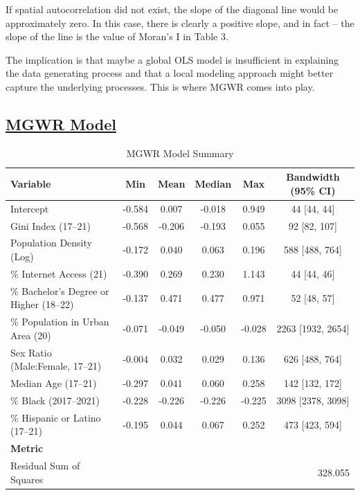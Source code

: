\documentclass[
]{article}
\begin{document}
If spatial autocorrelation did not exist, the slope of the diagonal line
would be approximately zero. In this case, there is clearly a positive
slope, and in fact -- the slope of the line is the value of Moran's I in
Table 3.

The implication is that maybe a global OLS model is insufficient in
explaining the data generating process and that a local modeling
approach might better capture the underlying processes. This is where
MGWR comes into play.

\newpage

\subsection{\texorpdfstring{\ul{MGWR
Model}}{MGWR Model}}\label{mgwr-model}

\begin{table}[H]
\renewcommand{\arraystretch}{1.3}
\centering
\caption{MGWR Model Summary}
\label{tab:mgwr_summary}
\begin{tabular}{lccccc}
\hline
\textbf{Variable} & \textbf{Min} & \textbf{Mean} & \textbf{Median} & \textbf{Max} & \textbf{Bandwidth (95\% CI)} \\ \hline
Intercept                & -0.584 & 0.007 & -0.018 & 0.949 & 44 [44, 44] \\ 
Gini Index (17–21)       & -0.568 & -0.206 & -0.193 & 0.055 & 92 [82, 107] \\ 
Population Density (Log) & -0.172 & 0.040 & 0.063 & 0.196 & 588 [488, 764] \\ 
\% Internet Access (21)  & -0.390 & 0.269 & 0.230 & 1.143 & 44 [44, 46] \\ 
\% Bachelor's Degree or Higher (18–22) & -0.137 & 0.471 & 0.477 & 0.971 & 52 [48, 57] \\ 
\% Population in Urban Area (20) & -0.071 & -0.049 & -0.050 & -0.028 & 2263 [1932, 2654] \\ 
Sex Ratio (Male:Female, 17–21) & -0.004 & 0.032 & 0.029 & 0.136 & 626 [488, 764] \\ 
Median Age (17–21)       & -0.297 & 0.041 & 0.060 & 0.258 & 142 [132, 172] \\ 
\% Black (2017–2021)     & -0.228 & -0.226 & -0.226 & -0.225 & 3098 [2378, 3098] \\ 
\% Hispanic or Latino (17–21) & -0.195 & 0.044 & 0.067 & 0.252 & 473 [423, 594] \\ \hline
\textbf{Metric} & \multicolumn{5}{l}{} \\ \hline
Residual Sum of Squares  & \multicolumn{5}{r}{328.055} \\

\end{tabular}
\end{table}
\end{document}
